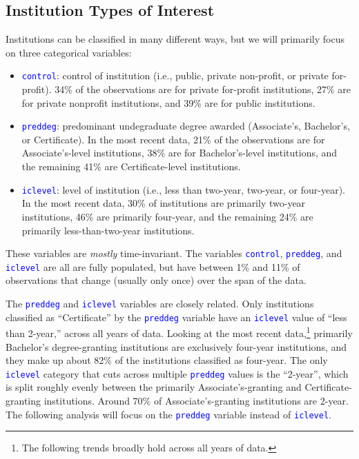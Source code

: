 \documentclass[12pt]{article}
\numberwithin{equation}{section}
\newcommand{\Varnm}[1]{\texttt{\textcolor{Blue}{#1}}}
\begin{document}
\subsection{Institution Types of Interest}
Institutions can be classified in many different ways, but we will primarily focus on three categorical variables:
\begin{itemize}
\item \Varnm{control}: control of institution (i.e., public, private non-profit, or private for-profit).  34\% of the observations are for private for-profit institutions, 27\% are for private nonprofit institutions, and 39\% are for public institutions.
\item \Varnm{preddeg}: predominant undegraduate degree awarded (Associate's, Bachelor's, or Certificate). In the most recent data, 21\% of the observations are for Associate's-level institutions, 38\% are for Bachelor's-level institutions, and the remaining 41\% are Certificate-level institutions.
\item \Varnm{iclevel}: level of institution (i.e., less than two-year, two-year, or four-year). In the most recent data, 30\% of institutions are primarily two-year institutions, 46\% are primarily four-year, and the remaining 24\% are primarily less-than-two-year institutions.
\end{itemize}
These variables are \textit{mostly} time-invariant. The variables \Varnm{control}, \Varnm{preddeg}, and \Varnm{iclevel} are all are fully populated, but have between 1\% and 11\% of observations that change (usually only once) over the span of the data. %

The \Varnm{preddeg} and \Varnm{iclevel} variables are closely related. Only institutions classified as \enquote{Certificate} by the \Varnm{preddeg} variable have an \Varnm{iclevel} value of \enquote{less than 2-year,} across all years of data. Looking at the most recent data,\footnote{The following trends broadly hold across all years of data.} primarily Bachelor's degree-granting institutions are exclusively four-year institutions, and they make up about 82\% of the institutions classified as four-year. The only \Varnm{iclevel} category that cuts across multiple \Varnm{preddeg} values is the \enquote{2-year}, which is split roughly evenly between the primarily Associate's-granting and Certificate-granting institutions. Around 70\% of Associate's-granting institutions are 2-year. The following analysis will focus on the \Varnm{preddeg} variable instead of \Varnm{iclevel}.
\end{document}
